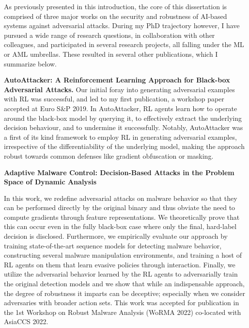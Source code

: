 As previously presented in this introduction, the core of this dissertation is comprised of three major works on the security and robustness of AI-based systems against adversarial attacks.
During my PhD trajectory however, I have pursued a wide range of research questions,
in collaboration with other colleagues, and participated in several research projects, all falling under the \gls{ML} or \gls{AML} umbrellas.
These resulted in several other publications, which I summarize below.

\textbf{AutoAttacker: A Reinforcement Learning Approach for Black-box Adversarial Attacks.}
Our initial foray into generating adversarial examples with \gls{RL} was successful, and led to my first publication, a workshop paper accepted at Euro S\&P 2019.
In AutoAttacker, \gls{RL} agents learn how to operate around the black-box model by querying it, to effectively extract the underlying decision behaviour, and to undermine it successfully.
Notably, AutoAttacker was a first of its kind framework to employ \gls{RL} in generating adversarial examples, irrespective of the differentiability of the underlying model, making the approach robust towards common defenses like gradient obfuscation or masking.

\begin{myleftbar}
\end{myleftbar}

\textbf{Adaptive Malware Control: Decision-Based Attacks in the Problem Space of Dynamic Analysis}

In this work, we redefine adversarial attacks on malware behavior so that they can be performed directly by the original binary and thus obviate the need to compute gradients through feature representations.
We theoretically prove that this can occur even in the fully black-box case where only the final, hard-label decision is disclosed.
Furthermore, we empirically evaluate our approach by training state-of-the-art sequence models for detecting malware behavior, constructing several malware manipulation environments, and training a host of \gls{RL} agents on them that learn evasive policies through interaction.
Finally, we utilize the adversarial behavior learned by the RL agents to adversarially train the original detection models and we show that while an indispensable approach, the degree of robustness it imparts can be deceptive; especially when we consider adversaries with broader action sets.
This work was accepted for publication in the 1st Workshop on Robust Malware Analysis (WoRMA 2022) co-located with AsiaCCS 2022.

